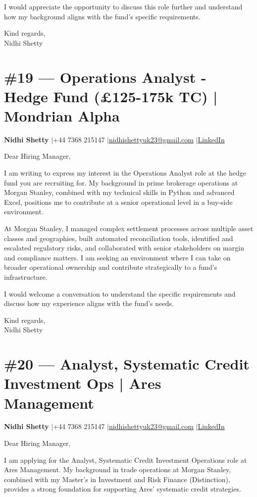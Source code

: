 \documentclass[11pt,a4paper]{article}
\makeatletter
\newcommand{\coverheader}{%
\begin{flushleft}
{\bfseries Nidhi Shetty} \enspace$\vert$\enspace +44 7368 215147 \enspace$\vert$\enspace \href{mailto:nidhishettyuk23@gmail.com}{nidhishettyuk23@gmail.com} \enspace$\vert$\enspace \href{https://www.linkedin.com/in/nidhi-shetty23-1841b7181}{LinkedIn}
\end{flushleft}
\vspace{4pt}
}
\makeatother
\begin{document}
I would appreciate the opportunity to discuss this role further and understand how my background aligns with the fund's specific requirements.

\vspace{8pt}
Kind regards,\\
Nidhi Shetty

\newpage
\section{\#19 --- Operations Analyst - Hedge Fund (\pounds125-175k TC) | Mondrian Alpha}
\coverheader

Dear Hiring Manager,

I am writing to express my interest in the Operations Analyst role at the hedge fund you are recruiting for. My background in prime brokerage operations at Morgan Stanley, combined with my technical skills in Python and advanced Excel, positions me to contribute at a senior operational level in a buy-side environment.

At Morgan Stanley, I managed complex settlement processes across multiple asset classes and geographies, built automated reconciliation tools, identified and escalated regulatory risks, and collaborated with senior stakeholders on margin and compliance matters. I am seeking an environment where I can take on broader operational ownership and contribute strategically to a fund's infrastructure.

I would welcome a conversation to understand the specific requirements and discuss how my experience aligns with the fund's needs.

\vspace{8pt}
Kind regards,\\
Nidhi Shetty

\newpage
\section{\#20 --- Analyst, Systematic Credit Investment Ops | Ares Management}
\coverheader

Dear Hiring Manager,

I am applying for the Analyst, Systematic Credit Investment Operations role at Ares Management. My background in trade operations at Morgan Stanley, combined with my Master's in Investment and Risk Finance (Distinction), provides a strong foundation for supporting Ares' systematic credit strategies.
\end{document}
